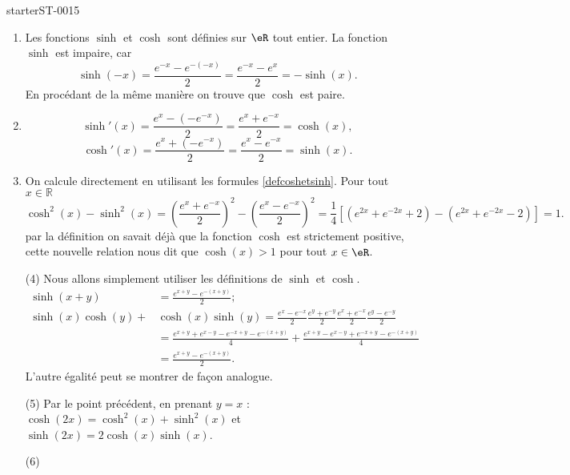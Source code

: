 
\begin{corrige}{starterST-0015}


\begin{enumerate}
\item Les fonctions  $\sinh$ et  $\cosh$ sont définies sur $\eR$ tout entier. La fonction $\sinh$ est impaire, car 
  \begin{equation*}
    \sinh(-x) = \frac{e^{-x}-e^{-(-x)}}{2} = \frac{e^{-x}-e^{x}}{2} = -\sinh(x).
  \end{equation*}
En procédant de la m\^eme manière on trouve que $\cosh$ est paire.  
\item 
\[
\sinh'(x) = \frac{e^{x}-\left(-e^{-x}\right)}{2} = \frac{e^{x}+e^{-x}}{2}  = \cosh(x),
\]
\[
\cosh'(x) = \frac{e^{x}+\left(-e^{-x}\right)}{2} = \frac{e^{x}-e^{-x}}{2}  = \sinh(x).
\]
\item On calcule directement en utilisant les formules \eqref{defcoshetsinh}. Pour tout $x\in\mathbb{R}$ 
\[
\cosh^2 (x) - \sinh^2 (x) = \left(\frac{e^{x}+e^{-x}}{2}\right)^2 -\left(\frac{e^{x}-e^{-x}}{2}\right)^2 = \frac{1}{4} \left[(e^{2x}+e^{-2x}+2) - (e^{2x}+e^{-2x}-2)\right] = 1.
\]
par la définition on savait déjà que la fonction $\cosh$ est strictement positive, cette nouvelle relation nous dit que $\cosh(x)>1$ pour tout $x\in\eR$.
\item[(4)] Nous allons simplement utiliser les définitions de $\sinh$ et  $\cosh$. 
  \begin{equation*}
    \begin{aligned}
      \sinh (x+y)& = \frac{e^{x+y}-e^{-(x+y)}}{2} ; \\
      \sinh(x) \cosh(y)+&\cosh(x)\sinh(y) =\frac{e^{x}-e^{-x}}{2}\frac{e^{y}+e^{-y}}{2}\frac{e^{x}+e^{-x}}{2}\frac{e^{y}-e^{-y}}{2}\\
      &=\frac{e^{x+y}+e^{x-y}-e^{-x+y}-e^{-(x+y)}}{4} +\frac{e^{x+y}-e^{x-y}+e^{-x+y}-e^{-(x+y)}}{4} \\
      &=\frac{e^{x+y}-e^{-(x+y)}}{2}. 
    \end{aligned}
  \end{equation*}
  L'autre égalité peut se montrer de façon analogue.
\item[(5)] Par le point précédent, en prenant $y=x$ : $\cosh(2x)=\cosh^2(x)+\sinh^2(x) $ et $\sinh(2x)= 2\cosh(x)\sinh(x) $.
 \item[(6)] 
   \begin{equation*}

\end{equation*}
\end{enumerate}
\end{corrige}
